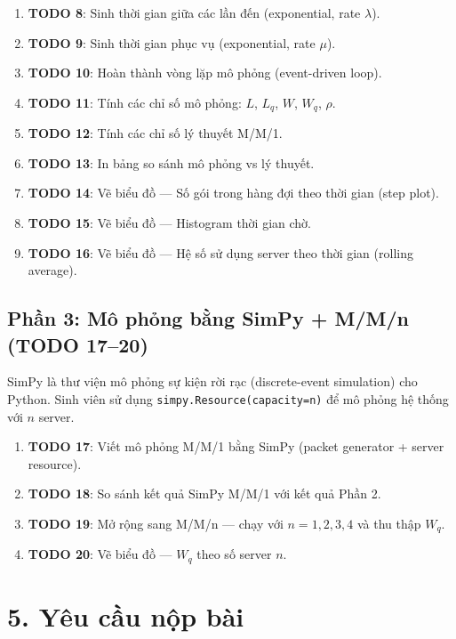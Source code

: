 \documentclass[12pt,a4paper]{article}
\begin{document}
\begin{enumerate}[nosep]
  \item \textbf{TODO 8}: Sinh thời gian giữa các lần đến (exponential, rate $\lambda$).
  \item \textbf{TODO 9}: Sinh thời gian phục vụ (exponential, rate $\mu$).
  \item \textbf{TODO 10}: Hoàn thành vòng lặp mô phỏng (event-driven loop).
  \item \textbf{TODO 11}: Tính các chỉ số mô phỏng: $L$, $L_q$, $W$, $W_q$, $\rho$.
  \item \textbf{TODO 12}: Tính các chỉ số lý thuyết M/M/1.
  \item \textbf{TODO 13}: In bảng so sánh mô phỏng vs lý thuyết.
  \item \textbf{TODO 14}: Vẽ biểu đồ — Số gói trong hàng đợi theo thời gian (step plot).
  \item \textbf{TODO 15}: Vẽ biểu đồ — Histogram thời gian chờ.
  \item \textbf{TODO 16}: Vẽ biểu đồ — Hệ số sử dụng server theo thời gian (rolling average).
\end{enumerate}

\subsection{Phần 3: Mô phỏng bằng SimPy + M/M/n (TODO 17–20)}

SimPy là thư viện mô phỏng sự kiện rời rạc (discrete-event simulation) cho Python. Sinh viên sử dụng \texttt{simpy.Resource(capacity=n)} để mô phỏng hệ thống với $n$ server.

\begin{enumerate}[nosep]
  \item \textbf{TODO 17}: Viết mô phỏng M/M/1 bằng SimPy (packet generator + server resource).
  \item \textbf{TODO 18}: So sánh kết quả SimPy M/M/1 với kết quả Phần 2.
  \item \textbf{TODO 19}: Mở rộng sang M/M/n — chạy với $n = 1, 2, 3, 4$ và thu thập $W_q$.
  \item \textbf{TODO 20}: Vẽ biểu đồ — $W_q$ theo số server $n$.
\end{enumerate}

\section{5. Yêu cầu nộp bài}
\end{document}
